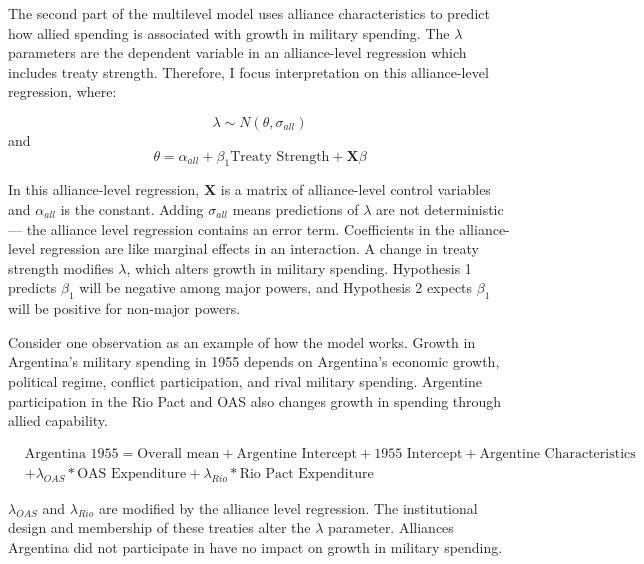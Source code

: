 \documentclass[12pt]{article}
\begin{document}
The second part of the multilevel model uses alliance characteristics to predict how allied spending is associated with growth in military spending. 
The $\lambda$ parameters are the dependent variable in an alliance-level regression which includes treaty strength.
Therefore, I focus interpretation on this alliance-level regression, where: 

\begin{equation}
\lambda \sim N(\theta, \sigma_{all})
\end{equation} 
and 
\begin{equation}
\theta = \alpha_{all} + \beta_1 \mbox{Treaty Strength} + \textbf{X} \beta
\end{equation}

In this alliance-level regression, $\textbf{X}$ is a matrix of alliance-level control variables and $\alpha_{all}$ is the constant.
Adding $\sigma_{all}$ means predictions of $\lambda$ are not deterministic--- the alliance level regression contains an error term. 
Coefficients in the alliance-level regression are like marginal effects in an interaction. 
A change in treaty strength modifies $\lambda$, which alters growth in military spending.
Hypothesis 1 predicts $\beta_1$ will be negative among major powers, and Hypothesis 2 expects $\beta_1$ will be positive for non-major powers.  


Consider one observation as an example of how the model works. 
Growth in Argentina's military spending in 1955 depends on Argentina's economic growth, political regime, conflict participation, and rival military spending. 
Argentine participation in the Rio Pact and OAS also changes growth in spending through allied capability. 


\begin{equation}
\begin{split}
& \mbox{Argentina 1955} = \mbox{Overall mean}
+ \mbox{Argentine Intercept} + \mbox{1955 Intercept} 
+ \mbox{Argentine Characteristics} \\
& + \lambda_{OAS} * \mbox{OAS Expenditure} + \lambda_{Rio} * \mbox{Rio Pact Expenditure}
\end{split} 
\end{equation}


$\lambda_{OAS}$ and $\lambda_{Rio}$ are modified by the alliance level regression. 
The institutional design and membership of these treaties alter the $\lambda$ parameter.
Alliances Argentina did not participate in have no impact on growth in military spending. 
\end{document}
